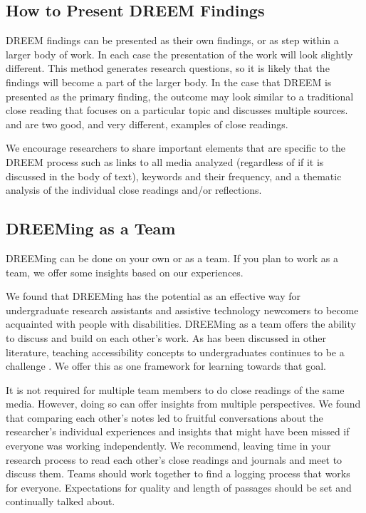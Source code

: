\subsection{How to Present DREEM Findings}
DREEM findings can be presented as their own findings, or as step within a larger body of work. In each case the presentation of the work will look slightly different. This method generates research questions, so it is likely that the findings will become a part of the larger body. In the case that DREEM is presented as the primary finding, the outcome may look similar to a traditional close reading that focuses on a particular topic and discusses multiple sources. \cite{cullenBetterWorldExamples2018} and \cite{mingusReflectingFridaKahlo2010} are two good, and very different, examples of close readings.

We encourage researchers to share important elements that are specific to the DREEM process such as links to all media analyzed (regardless of if it is discussed in the body of text), keywords and their frequency, and a thematic analysis of the individual close readings and/or reflections. 

\subsection{DREEMing as a Team}
DREEMing can be done on your own or as a team. If you plan to work as a team, we offer some insights based on our experiences.

We found that DREEMing has the potential as an effective way for undergraduate research assistants and assistive technology newcomers to become acquainted with people with disabilities. DREEMing as a team offers the ability to discuss and build on each other's work. As has been discussed in other literature, teaching accessibility concepts to undergraduates continues to be a challenge \cite{shinoharaDesignSocialAccessibility2020}. We offer this as one framework for learning towards that goal. 

It is not required for multiple team members to do close readings of the same media. However, doing so can offer insights from multiple perspectives. We found that comparing each other's notes led to fruitful conversations about the researcher's individual experiences and insights that might have been missed if everyone was working independently. We recommend, leaving time in your research process to read each other's close readings and journals and meet to discuss them. Teams should work together to find a logging process that works for everyone. Expectations for quality and length of passages should be set and continually talked about. 


